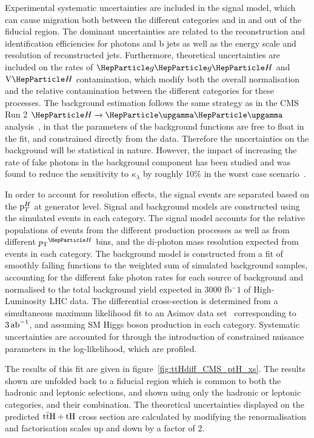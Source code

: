 Experimental systematic uncertainties are included in the signal model, which can cause migration both between the different categories and in and out of the fiducial region. The dominant uncertainties are related to the reconstruction and identification efficiencies for photons and b jets as well as the energy scale and resolution of reconstructed jets. 
Furthermore, theoretical uncertainties are included on the rates of $\ggh$ and $\vh$ contamination, which modify both the overall normalisation and the relative contamination between the different categories for these processes. The background estimation follows the same strategy as in the CMS Run 2 $\hgg$ analysis~\cite{Sirunyan:2018ouh}, in that the parameters of the background functions are free to float in the fit, and constrained directly from the data. Therefore the uncertainties on the background will be statistical in nature.
However, the impact of increasing the rate of fake photons in the background component has been studied and was found to reduce the sensitivity to $\kappa_\lambda$ by roughly 10\% in the worst case scenario~\cite{CMS-PAS-FTR-18-020}.  


In order to account for resolution effects, the signal events are separated based on the $\mathrm{p}_{T}^H$ at generator level.   Signal and background models are constructed using the simulated events in each category. The signal model accounts for the relative populations of events from the different production processes as well as from different $\pTH$ bins, and the di-photon mass resolution expected from events in each category. The background model is constructed from a fit of smoothly falling functions to the weighted sum of simulated background samples, accounting for the different fake photon rates for each source of background and normalised to the  total background yield expected in 3000 fb$^-1$ of High-Luminosity LHC data. The differential cross-section is determined from a simultaneous maximum likelihood fit to an Asimov data set~\cite{Cowan:2010js} corresponding to $3\mbox{\ensuremath{\,\text{ab}^\text{$-$1}}}$, and assuming SM Higgs boson  production in each category.  Systematic uncertainties are accounted for through the introduction of constrained nuisance parameters in the log-likelihood, which are profiled. 

The results of this fit are given in figure~\ref{fig:ttHdiff_CMS_ptH_xs}. The results shown are unfolded back to a fiducial region which is common to both the hadronic and leptonic selections, and shown using only the hadronic or leptonic categories, and their combination. The theoretical uncertainties displayed on the predicted $\text{t}\overline{\text{t}}\text{H}+\text{tH}$ cross section are calculated by modifying the renormalisation and factorisation scales up and down by a factor of 2.

